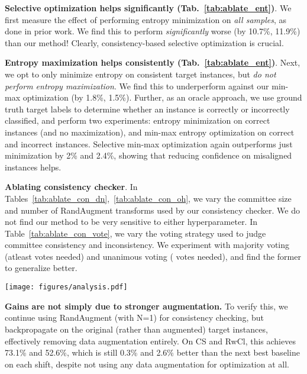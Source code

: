 \documentclass[10pt,twocolumn,letterpaper]{article}
\newcommand{\method}{\texttt{SENTRY}\xspace}
\begin{document}
\noindent \textbf{Selective optimization helps significantly (Tab.~\ref{tab:ablate_ent})}. We first measure the effect of performing entropy minimization on \emph{all samples}, as done in prior work. We find this to perform \emph{significantly} worse (by 10.7\%, 11.9\%) than our method! Clearly, consistency-based selective optimization is crucial. 

\noindent \textbf{Entropy maximization helps consistently (Tab.~\ref{tab:ablate_ent})}. Next, we opt to only minimize entropy on consistent target instances, but \emph{do not perform entropy maximization}. We find this to underperform against our min-max optimization (by 1.8\%, 1.5\%).
Further, as an oracle approach, we use ground truth target labels to determine whether an instance is correctly or incorrectly classified, and perform two experiments: entropy minimization on correct instances (and no maximization), and min-max entropy optimization on correct and incorrect instances. Selective min-max optimization again outperforms just minimization by 2\% and 2.4\%, showing that reducing confidence on misaligned instances helps.


\noindent \textbf{Ablating consistency checker}. In Tables~\ref{tab:ablate_con_dn},~\ref{tab:ablate_con_oh}, we vary the committee size  and number of RandAugment transforms  used by our consistency checker. We do not find our method to be very sensitive to either hyperparameter. In Table~\ref{tab:ablate_con_vote}, we vary the voting strategy used to judge committee consistency and inconsistency. We experiment with majority voting (atleast  votes needed) and unanimous voting ( votes needed), and find the former to generalize better.


\begin{figure*}[t]
    \centering
    \texttt{[image: figures/analysis.pdf]}
    \vspace{-8pt}
    \caption{
    Analysis of \method on ClipartSketch. \textbf{Left:} \% of seen target instances selected for entropy minimization and maximization over epochs. \textbf{Middle:} \% of seen target data chosen for entropy minimization at the end of first and last epochs of adaptation, broken down by class. \textbf{Right:} Ground truth precision of \method's committee consistency strategy at identifying correct and incorrect instances over epochs.
    }
    \vspace{-15pt}
    \label{fig:consistency_perf}
 \end{figure*}


 \noindent \textbf{Gains are not simply due to stronger augmentation.} To verify this, we continue using RandAugment (with N=1) for consistency checking, but backpropagate on the original (rather than augmented) target instances, effectively removing data augmentation entirely. On CS and RwCl, this achieves 73.1\% and 52.6\%, which is still 0.3\% and 2.6\% better than the next best baseline on each shift, despite not using any data augmentation for optimization at all.
\end{document}
